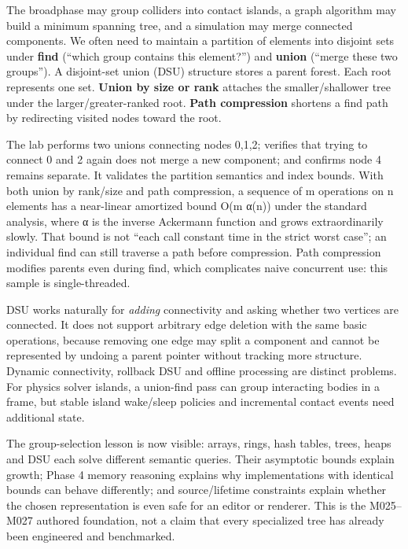 The broadphase may group colliders into contact islands, a graph algorithm may build a minimum spanning tree, and a simulation may merge connected components. We often need to maintain a partition of elements into disjoint sets under \textbf{find} (``which group contains this element?'') and \textbf{union} (``merge these two groups''). A disjoint-set union (DSU) structure stores a parent forest. Each root represents one set. \textbf{Union by size or rank} attaches the smaller/shallower tree under the larger/greater-ranked root. \textbf{Path compression} shortens a find path by redirecting visited nodes toward the root.

The lab performs two unions connecting nodes 0,1,2; verifies that trying to connect 0 and 2 again does not merge a new component; and confirms node 4 remains separate. It validates the partition semantics and index bounds. With both union by rank/size and path compression, a sequence of m operations on n elements has a near-linear amortized bound O(m α(n)) under the standard analysis, where α is the inverse Ackermann function and grows extraordinarily slowly. That bound is not ``each call constant time in the strict worst case''; an individual find can still traverse a path before compression. Path compression modifies parents even during find, which complicates naive concurrent use: this sample is single-threaded.

DSU works naturally for \emph{adding} connectivity and asking whether two vertices are connected. It does not support arbitrary edge deletion with the same basic operations, because removing one edge may split a component and cannot be represented by undoing a parent pointer without tracking more structure. Dynamic connectivity, rollback DSU and offline processing are distinct problems. For physics solver islands, a union-find pass can group interacting bodies in a frame, but stable island wake/sleep policies and incremental contact events need additional state.

The group-selection lesson is now visible: arrays, rings, hash tables, trees, heaps and DSU each solve different semantic queries. Their asymptotic bounds explain growth; Phase 4 memory reasoning explains why implementations with identical bounds can behave differently; and source/lifetime constraints explain whether the chosen representation is even safe for an editor or renderer. This is the M025--M027 authored foundation, not a claim that every specialized tree has already been engineered and benchmarked.

